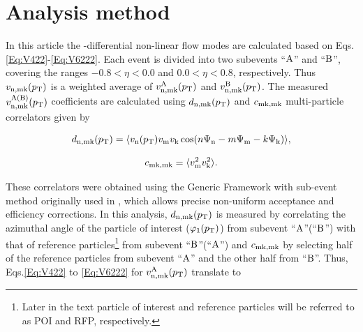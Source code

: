 \section{Analysis method}
\label{Sec:Analysis method}
In this article the \pT-differential non-linear flow modes are calculated based on Eqs. \ref{Eq:V422}-\ref{Eq:V6222}. Each event is divided into two subevents ``$\rm{A}$'' and ``$\rm{B}$'', covering the ranges $-0.8< \eta < 0.0$ and $0.0 <\eta< 0.8$, respectively. Thus $v_{\rm n,mk}(p_{\rm{T}})$ is a weighted average of $v_{\rm n,mk}^{\rm{A}}(p_{\rm{T}})$ and $v_{\rm n,mk}^{\rm{B}}(p_{\rm{T}})$. The measured $v_{\rm n,mk}^{\rm{A(B)}}(p_{\rm{T}})$ coefficients are calculated using $d_{\rm n,mk}(p_{\rm{T}})$ and $c_{\rm mk,mk}$ multi-particle correlators given by

\begin{equation}
d_{\rm n,mk}(p_{\rm{T}}) = \langle v_{\rm n}(p_{\rm{T}})v_{\rm m}v_{\rm k}\cos(n\Psi_{\rm n}-m\Psi_{\rm m}-k\Psi_{\rm k}) \rangle,
\label{Eq:dnmki}
\end{equation}


\begin{equation}
c_{\rm mk,mk} = \langle v_{\rm m}^{2}v_{\rm k}^{2}\rangle.
\label{Eq:cmkimki}
\end{equation}

 
These correlators were obtained using the Generic Framework with sub-event method originally used in \cite{Bilandzic:2013kga,Acharya:2017zfg,Pacik:2711398}, which allows precise non-uniform acceptance and efficiency corrections. In this analysis, $d_{\rm n,mk}(p_{\rm{T}})$ is measured by correlating the azimuthal angle of the particle of interest ($\varphi_{1}(p_{\rm T})$) from subevent ``$\rm{A}$''(``$\rm{B}$'') with that of reference particles\footnote{Later in the text particle of interest and reference particles will be referred to as POI and RFP, respectively.} from subevent ``$\rm{B}$''(``$\rm{A}$'') and $c_{\rm mk,mk}$ by selecting half of the reference particles from subevent ``$\rm{A}$'' and the other half from ``$\rm{B}$''. Thus, Eqs.\ref{Eq:V422} to \ref{Eq:V6222} for $v_{\rm n,mk}^{\rm{A}}(p_{\rm{T}})$ translate to

